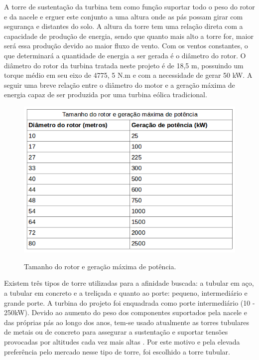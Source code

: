   A torre de sustentação da turbina tem como função suportar todo o peso do rotor e da nacele e erguer este conjunto a uma altura onde as pás possam girar com segurança e distantes do solo. A altura da torre tem uma relação direta com a capacidade de produção de energia, sendo que quanto mais alto a torre for, maior será essa produção devido ao maior fluxo de vento. Com os ventos constantes, o que determinará a quantidade de energia a ser gerada é o diâmetro do rotor. O diâmetro do rotor da turbina tratada neste projeto é de 18,5 m, possuindo um torque médio em seu eixo de   4775, 5 N.m e com a necessidade de gerar 50 kW. A seguir uma breve relação entre o diâmetro do motor e a geração máxima de energia capaz de ser produzida por uma turbina eólica tradicional. \footnotemark
  
  \begin{figure}[!h]
    \centering
    \includegraphics[scale = 0.5]{editaveis/figuras/tamanho_rotor}
    \label{tamanho_rotor}
    \caption[Tamanho do rotor e geração máxima de potência]{Tamanho do rotor e geração máxima de potência. \footnotemark}
   \end{figure}
   \FloatBarrier
   
   Existem três tipos de torre utilizadas para a afinidade buscada: a tubular em aço, a tubular em concreto e a treliçada e quanto ao porte: pequeno, intermediário e grande porte. A turbina do projeto foi enquadrada como porte intermediário (10 - 250kW).  Devido ao aumento do peso dos componentes suportados pela nacele e das próprias pás ao longo dos anos, tem-se usado atualmente as torres tubulares de metais ou de concreto para assegurar a sustentação e suportar tensões provocadas por altitudes cada vez mais altas \footnotemark. Por este motivo e pela elevada preferência pelo mercado nesse tipo de torre, foi escolhido a torre tubular.
   
